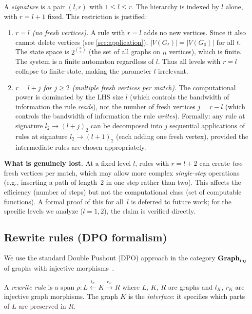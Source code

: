 \documentclass{../shared/primo}
\begin{document}
A \emph{signature} is a pair $(l, r)$ with $1 \leq l \leq r$. The hierarchy is indexed by $l$ alone, with $r = l + 1$ fixed. This restriction is justified:

\begin{proposition}[Justification of $r = l+1$]\label{prop:rl1}
\leavevmode
\begin{enumerate}
\item[\textup{(i)}] \emph{$r = l$ (no fresh vertices).} A rule with $r = l$ adds no new vertices. Since it also cannot delete vertices (see \cref{sec:application}), $|V(G_t)| = |V(G_0)|$ for all $t$. The state space is $2^{\binom{n}{2}}$ (the set of all graphs on $n$ vertices), which is finite. The system is a finite automaton regardless of $l$. Thus all levels with $r = l$ collapse to finite-state, making the parameter $l$ irrelevant.
\item[\textup{(ii)}] \emph{$r = l + j$ for $j \geq 2$ (multiple fresh vertices per match).} The computational power is dominated by the LHS size $l$ (which controls the bandwidth of information the rule \emph{reads}), not the number of fresh vertices $j = r - l$ (which controls the bandwidth of information the rule \emph{writes}). Formally: any rule at signature $l_2 \to (l{+}j)_2$ can be decomposed into $j$ sequential applications of rules at signature $l_2 \to (l{+}1)_2$ (each adding one fresh vertex), provided the intermediate rules are chosen appropriately.
\end{enumerate}
\end{proposition}

\textbf{What is genuinely lost.} At a fixed level $l$, rules with $r = l + 2$ can create \emph{two} fresh vertices per match, which may allow more complex \emph{single-step} operations (e.g., inserting a path of length~2 in one step rather than two). This affects the efficiency (number of steps) but not the computational class (set of computable functions). A formal proof of this for all~$l$ is deferred to future work; for the specific levels we analyze ($l = 1, 2$), the claim is verified directly.

\subsection{Rewrite rules (DPO formalism)}

We use the standard Double Pushout (DPO) approach in the category $\mathbf{Graph}_{\mathrm{inj}}$ of graphs with injective morphisms~\cite{ehrig2006fundamentals}.

A \emph{rewrite rule} is a span $\rho: L \xleftarrow{l_K} K \xrightarrow{r_K} R$ where $L$, $K$, $R$ are graphs and $l_K$, $r_K$ are injective graph morphisms. The graph $K$ is the \emph{interface}: it specifies which parts of $L$ are preserved in $R$.
\end{document}
